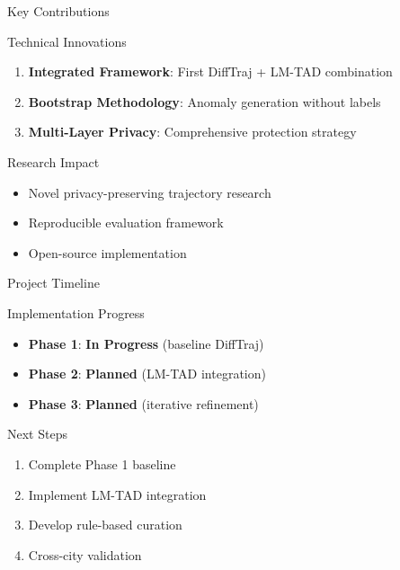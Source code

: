 \documentclass[aspectratio=169,xcolor={dvipsnames}]{beamer}
\newcommand{\phase}[1]{\textcolor{ScienceBlue}{\textbf{Phase #1}}}
\begin{document}
\begin{frame}{Key Contributions}
  \begin{block}{Technical Innovations}
    \begin{enumerate}
      \item \textbf{Integrated Framework}: First DiffTraj + LM-TAD combination
      \item \textbf{Bootstrap Methodology}: Anomaly generation without labels
      \item \textbf{Multi-Layer Privacy}: Comprehensive protection strategy
    \end{enumerate}
  \end{block}
  
  \vspace{1em}
  \begin{block}{Research Impact}
    \begin{itemize}
      \item Novel privacy-preserving trajectory research
      \item Reproducible evaluation framework
      \item Open-source implementation
    \end{itemize}
  \end{block}
\end{frame}

\begin{frame}{Project Timeline}
  \begin{block}{Implementation Progress}
    \begin{itemize}
      \item \phase{1}: \textcolor{AbsoluteZero}{\textbf{In Progress}} (baseline DiffTraj)
      \item \phase{2}: \textbf{Planned} (LM-TAD integration)
      \item \phase{3}: \textbf{Planned} (iterative refinement)
    \end{itemize}
  \end{block}
  
  \vspace{1em}
  \begin{block}{Next Steps}
    \begin{enumerate}
      \item Complete Phase 1 baseline
      \item Implement LM-TAD integration
      \item Develop rule-based curation
      \item Cross-city validation
    \end{enumerate}
  \end{block}
\end{frame}
\end{document}
